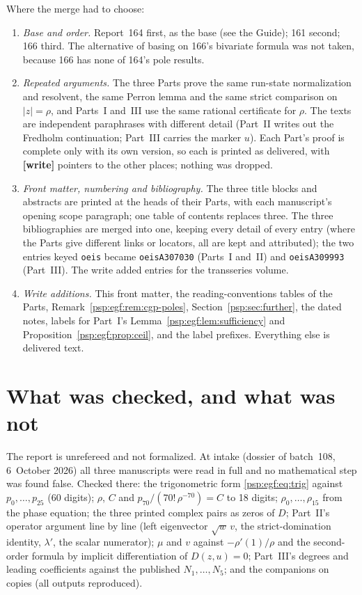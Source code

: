 \documentclass[11pt,letterpaper]{article}
\numberwithin{equation}{section}
\theoremstyle{remark}\newtheorem{remark}[theorem]{Remark}
\begin{document}
Where the merge had to choose:
\begin{enumerate}
\item \emph{Base and order.} Report~164 first, as the base (see the Guide); 161 second; 166 third. The alternative of basing on 166's bivariate formula was not taken, because 166 has none of 164's pole results.
\item \emph{Repeated arguments.} The three Parts prove the same run-state normalization and resolvent, the same Perron lemma and the same strict comparison on $|z|=\rho$, and Parts~I and~III use the same rational certificate for $\rho$. The texts are independent paraphrases with different detail (Part~II writes out the Fredholm continuation; Part~III carries the marker $u$). Each Part's proof is complete only with its own version, so each is printed as delivered, with \textbf{[write]} pointers to the other places; nothing was dropped.
\item \emph{Front matter, numbering and bibliography.} The three title blocks and abstracts are printed at the heads of their Parts, with each manuscript's opening scope paragraph; one table of contents replaces three. The three bibliographies are merged into one, keeping every detail of every entry (where the Parts give different links or locators, all are kept and attributed); the two entries keyed \texttt{oeis} became \texttt{oeisA307030} (Parts~I and~II) and \texttt{oeisA309993} (Part~III). The write added entries for the transseries volume.
\item \emph{Write additions.} This front matter, the reading-conventions tables of the Parts, Remark~\ref{psp:egf:rem:cgp-poles}, Section~\ref{psp:sec:further}, the dated notes, labels for Part~I's Lemma~\ref{psp:egf:lem:sufficiency} and Proposition~\ref{psp:egf:prop:ceil}, and the label prefixes. Everything else is delivered text.
\end{enumerate}

\section*{What was checked, and what was not}\label{psp:sec:trust}
The report is unrefereed and not formalized. At intake (dossier of batch~108, 6~October 2026) all three manuscripts were read in full and no mathematical step was found false. Checked there: the trigonometric form \eqref{psp:egf:eq:trig} against $p_0,\dots,p_{25}$ (60 digits); $\rho$, $C$ and $p_{70}/(70!\,\rho^{-70})=C$ to 18 digits; $\rho_0,\dots,\rho_{15}$ from the phase equation; the three printed complex pairs as zeros of $D$; Part~II's operator argument line by line (left eigenvector $\sqrt w\,v$, the strict-domination identity, $\lambda'$, the scalar numerator); $\mu$ and $v$ against $-\rho'(1)/\rho$ and the second-order formula by implicit differentiation of $D(z,u)=0$; Part~III's degrees and leading coefficients against the published $N_1,\dots,N_5$; and the companions on copies (all outputs reproduced).
\end{document}
